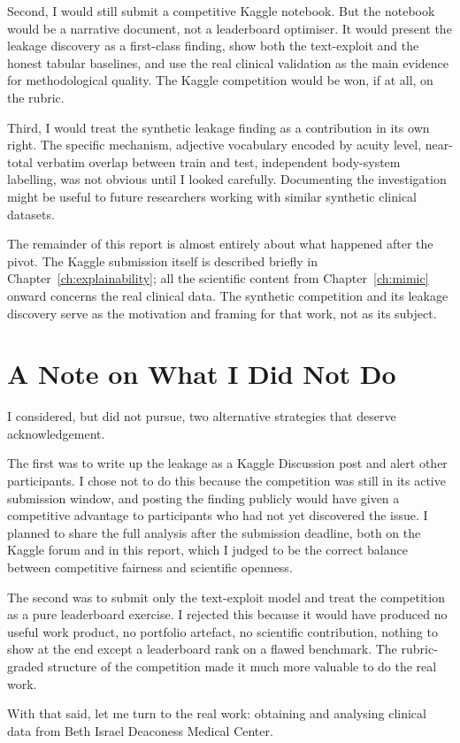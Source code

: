 Second, I would still submit a competitive Kaggle notebook. But the notebook would be a narrative document, not a leaderboard optimiser. It would present the leakage discovery as a first-class finding, show both the text-exploit and the honest tabular baselines, and use the real clinical validation as the main evidence for methodological quality. The Kaggle competition would be won, if at all, on the rubric.

Third, I would treat the synthetic leakage finding as a contribution in its own right. The specific mechanism, adjective vocabulary encoded by acuity level, near-total verbatim overlap between train and test, independent body-system labelling, was not obvious until I looked carefully. Documenting the investigation might be useful to future researchers working with similar synthetic clinical datasets.

\begin{highlightbox}
The remainder of this report is almost entirely about what happened after the pivot. The Kaggle submission itself is described briefly in Chapter~\ref{ch:explainability}; all the scientific content from Chapter~\ref{ch:mimic} onward concerns the real clinical data. The synthetic competition and its leakage discovery serve as the motivation and framing for that work, not as its subject.
\end{highlightbox}

\section{A Note on What I Did Not Do}

I considered, but did not pursue, two alternative strategies that deserve acknowledgement.

The first was to write up the leakage as a Kaggle Discussion post and alert other participants. I chose not to do this because the competition was still in its active submission window, and posting the finding publicly would have given a competitive advantage to participants who had not yet discovered the issue. I planned to share the full analysis after the submission deadline, both on the Kaggle forum and in this report, which I judged to be the correct balance between competitive fairness and scientific openness.

The second was to submit only the text-exploit model and treat the competition as a pure leaderboard exercise. I rejected this because it would have produced no useful work product, no portfolio artefact, no scientific contribution, nothing to show at the end except a leaderboard rank on a flawed benchmark. The rubric-graded structure of the competition made it much more valuable to do the real work.

With that said, let me turn to the real work: obtaining and analysing clinical data from Beth Israel Deaconess Medical Center.
